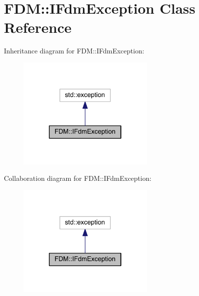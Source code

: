 \hypertarget{class_f_d_m_1_1_i_fdm_exception}{}\section{F\+D\+M\+:\+:I\+Fdm\+Exception Class Reference}
\label{class_f_d_m_1_1_i_fdm_exception}


Inheritance diagram for F\+D\+M\+:\+:I\+Fdm\+Exception\+:
\nopagebreak
\begin{figure}[H]
\begin{center}
\leavevmode
\includegraphics[width=190pt]{class_f_d_m_1_1_i_fdm_exception__inherit__graph}
\end{center}
\end{figure}


Collaboration diagram for F\+D\+M\+:\+:I\+Fdm\+Exception\+:
\nopagebreak
\begin{figure}[H]
\begin{center}
\leavevmode
\includegraphics[width=190pt]{class_f_d_m_1_1_i_fdm_exception__coll__graph}
\end{center}
\end{figure}
